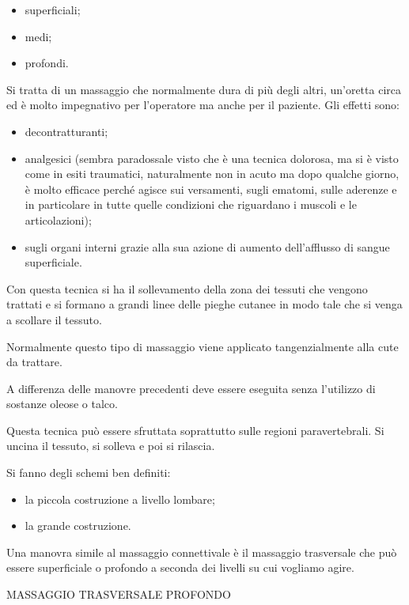 \documentclass[]{article}
\begin{document}
\begin{itemize}
\item
  superficiali;
\item
  medi;
\item
  profondi.
\end{itemize}

Si tratta di un massaggio che normalmente dura di più degli altri,
un'oretta circa ed è molto impegnativo per l'operatore ma anche per il
paziente. Gli effetti sono:

\begin{itemize}
\item
  decontratturanti;
\item
  analgesici (sembra paradossale visto che è una tecnica dolorosa, ma si
  è visto come in esiti traumatici, naturalmente non in acuto ma dopo
  qualche giorno, è molto efficace perché agisce sui versamenti, sugli
  ematomi, sulle aderenze e in particolare in tutte quelle condizioni
  che riguardano i muscoli e le articolazioni);
\item
  sugli organi interni grazie alla sua azione di aumento dell'afflusso
  di sangue superficiale.
\end{itemize}

Con questa tecnica si ha il sollevamento della zona dei tessuti che
vengono trattati e si formano a grandi linee delle pieghe cutanee in
modo tale che si venga a scollare il tessuto.

Normalmente questo tipo di massaggio viene applicato tangenzialmente
alla cute da trattare.

A differenza delle manovre precedenti deve essere eseguita senza
l'utilizzo di sostanze oleose o talco.

Questa tecnica può essere sfruttata soprattutto sulle regioni
paravertebrali. Si uncina il tessuto, si solleva e poi si rilascia.

Si fanno degli schemi ben definiti:

\begin{itemize}
\item
  la piccola costruzione a livello lombare;
\item
  la grande costruzione.
\end{itemize}

Una manovra simile al massaggio connettivale è il massaggio trasversale
che può essere superficiale o profondo a seconda dei livelli su cui
vogliamo agire.

MASSAGGIO TRASVERSALE PROFONDO
\end{document}
